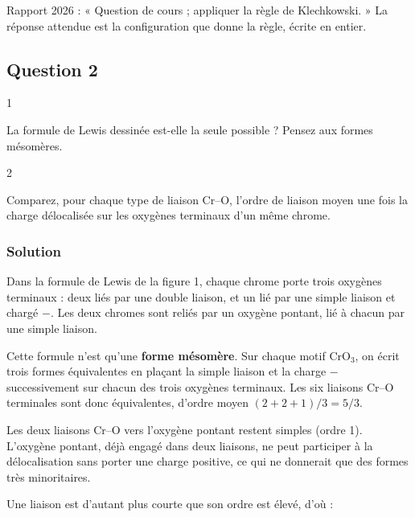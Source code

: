 \documentclass[11pt,a4paper]{article}
\begin{document}
\begin{jury}

Rapport 2026 : « Question de cours ; appliquer la règle de Klechkowski. » La réponse attendue est la configuration que donne la règle, écrite en entier.

\end{jury}

\hypertarget{question-2}{%
\subsection{Question 2}\label{question-2}}

\begin{indication}{1}

La formule de Lewis dessinée est-elle la seule possible ? Pensez aux formes mésomères.

\end{indication}

\begin{indication}{2}

Comparez, pour chaque type de liaison Cr--O, l'ordre de liaison moyen une fois la charge délocalisée sur les oxygènes terminaux d'un même chrome.

\end{indication}

\hypertarget{solution-1}{%
\subsubsection{Solution}\label{solution-1}}

Dans la formule de Lewis de la figure 1, chaque chrome porte trois oxygènes terminaux : deux liés par une double liaison, et un lié par une simple liaison et chargé \(-\). Les deux chromes sont reliés par un oxygène pontant, lié à chacun par une simple liaison.

Cette formule n'est qu'une \textbf{forme mésomère}. Sur chaque motif CrO\(_3\), on écrit trois formes équivalentes en plaçant la simple liaison et la charge \(-\) successivement sur chacun des trois oxygènes terminaux. Les six liaisons Cr--O terminales sont donc équivalentes, d'ordre moyen \((2+2+1)/3=5/3\).

Les deux liaisons Cr--O vers l'oxygène pontant restent simples (ordre 1). L'oxygène pontant, déjà engagé dans deux liaisons, ne peut participer à la délocalisation sans porter une charge positive, ce qui ne donnerait que des formes très minoritaires.

Une liaison est d'autant plus courte que son ordre est élevé, d'où :
\end{document}
